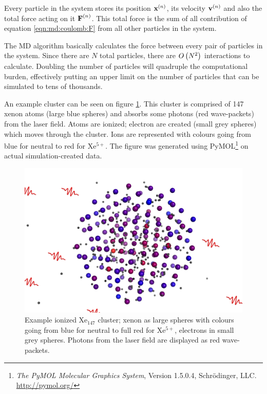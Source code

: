 

Every particle in the system stores its position $\textbf{x}^{\left( n \right)}$, its velocity
$\textbf{v}^{\left( n \right)}$ and also the total force acting on it $\textbf{F}^{\left( n \right)}$. This total
force is the sum of all contribution of equation \eqref{eqn:md:coulomb:F} from
all other particles in the system.

The MD algorithm basically calculates the force between every pair of particles
in the system. Since there 
are $N$ total particles, there are
$O\left( N^2 \right)$
interactions to calculate. Doubling the number of particles will quadruple the
computational burden, effectively putting an upper limit on the number of
particles that can be simulated to tens of thousands.


An example cluster can be seen on figure \ref{fig:md:cluster}. 
This
cluster
is comprised
of 147 xenon atoms (large blue spheres) and absorbs some photons (red
wave-packets) from the laser field. Atoms are ionized; electron are created
(small grey spheres) which moves through the cluster. Ions are represented with
colours going from blue for neutral to red for Xe$^{5+}$. The figure was
generated using
PyMOL\footnote{\textit{The PyMOL Molecular Graphics System}, Version 1.5.0.4,
Schrödinger, LLC. \url{http://pymol.org/}} on actual simulation-created data.


\begin{figure}
 \centering
 \includegraphics[width=\figurewidth]{figures/cluster}
 \caption{\label{fig:md:cluster}Example ionized Xe$_{147}$ cluster; xenon as
          large spheres with colours going from blue for neutral to full red for
          Xe$^{5+}$, electrons in small grey spheres. Photons from the laser
          field are displayed as red wave-packets.}
\end{figure}



